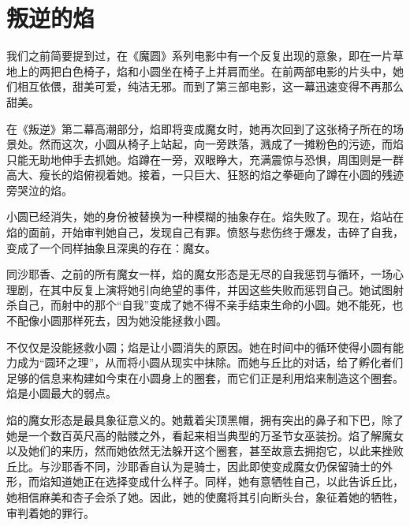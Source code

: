 \chapter{叛逆的焰}
我们之前简要提到过，在《魔圆》系列电影中有一个反复出现的意象，即在一片草地上的两把白色椅子，焰和小圆坐在椅子上并肩而坐。在前两部电影的片头中，她们相互依偎，甜美可爱，纯洁无邪。而到了第三部电影，这一幕迅速变得不再那么甜美。

在《叛逆》第二幕高潮部分，焰即将变成魔女时，她再次回到了这张椅子所在的场景处。然而这次，小圆从椅子上站起，向一旁跌落，溅成了一摊粉色的污迹，而焰只能无助地伸手去抓她。焰蹲在一旁，双眼睁大，充满震惊与恐惧，周围则是一群高大、瘦长的焰俯视着她。接着，一只巨大、狂怒的焰之拳砸向了蹲在小圆的残迹旁哭泣的焰。

小圆已经消失，她的身份被替换为一种模糊的抽象存在。焰失败了。现在，焰站在焰的面前，开始审判她自己，发现自己有罪。愤怒与悲伤终于爆发，击碎了自我，变成了一个同样抽象且深奥的存在：魔女。

同沙耶香、之前的所有魔女一样，焰的魔女形态是无尽的自我惩罚与循环，一场心理剧，在其中反复上演将她引向绝望的事件，并因这些失败而惩罚自己。她试图射杀自己，而射中的那个“自我”变成了她不得不亲手结束生命的小圆。她不能死，也不配像小圆那样死去，因为她没能拯救小圆。

不仅仅是没能拯救小圆；焰是让小圆消失的原因。她在时间中的循环使得小圆有能力成为“圆环之理”，从而将小圆从现实中抹除。而她与丘比的对话，给了孵化者们足够的信息来构建如今束在小圆身上的圈套，而它们正是利用焰来制造这个圈套。焰是小圆最大的弱点。

焰的魔女形态是最具象征意义的。她戴着尖顶黑帽，拥有突出的鼻子和下巴，除了她是一个数百英尺高的骷髅之外，看起来相当典型的万圣节女巫装扮。焰了解魔女以及她们的来历，然而她依然无法躲开这个圈套，甚至故意去拥抱它，以此来挫败丘比。与沙耶香不同，沙耶香自认为是骑士，因此即使变成魔女仍保留骑士的外形，而焰知道她正在选择变成什么样子。同样，她有意牺牲自己，以此告诉丘比，她相信麻美和杏子会杀了她。因此，她的使魔将其引向断头台，象征着她的牺牲，审判着她的罪行。

